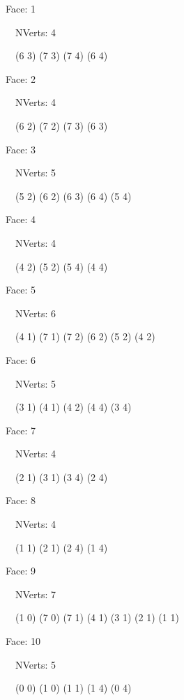 \documentclass{article}
\begin{document}
{\footnotesize 

Face: 1

\   \    NVerts: 4

 \   \   (6 3) (7 3) (7 4) (6 4)}

{\footnotesize 

Face: 2

\   \    NVerts: 4

 \   \   (6 2) (7 2) (7 3) (6 3)}

{\footnotesize 

Face: 3

\   \    NVerts: 5

 \   \   (5 2) (6 2) (6 3) (6 4) (5 4)}

{\footnotesize 

Face: 4

\   \    NVerts: 4

 \   \   (4 2) (5 2) (5 4) (4 4)}

{\footnotesize 

Face: 5

\   \    NVerts: 6

 \   \   (4 1) (7 1) (7 2) (6 2) (5 2) (4 2)}

{\footnotesize 

Face: 6

\   \    NVerts: 5

 \   \   (3 1) (4 1) (4 2) (4 4) (3 4)}

{\footnotesize 

Face: 7

\   \    NVerts: 4

 \   \   (2 1) (3 1) (3 4) (2 4)}

{\footnotesize 

Face: 8

\   \    NVerts: 4

 \   \   (1 1) (2 1) (2 4) (1 4)}

{\footnotesize 

Face: 9

\   \    NVerts: 7

 \   \   (1 0) (7 0) (7 1) (4 1) (3 1) (2 1) (1 1)}

{\footnotesize 

Face: 10

\   \    NVerts: 5

 \   \   (0 0) (1 0) (1 1) (1 4) (0 4)}


 \newpage
\end{document}
